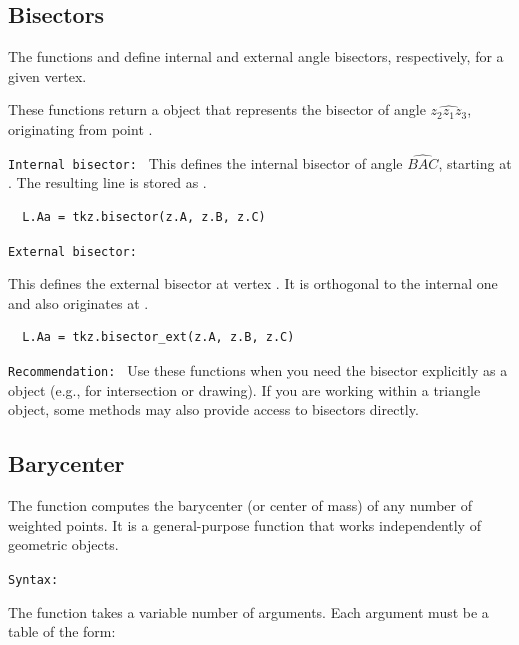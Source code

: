 \subsection{Bisectors}
\label{sub:bisector}

The functions  and  define internal and external angle bisectors, respectively, for a given vertex.

These functions return a  object that represents the bisector of angle $\widehat{z_2 z_1 z_3}$, originating from point .

\medskip
\texttt{Internal bisector: }
 This defines the internal bisector of angle $ \widehat{BAC}$, starting at . The resulting line is stored as .

\begin{mybox}
\begin{verbatim}
  L.Aa = tkz.bisector(z.A, z.B, z.C)
\end{verbatim}
\end{mybox}

\medskip
\texttt{External bisector: }

This defines the external bisector at vertex . It is orthogonal to the internal one and also originates at .

\begin{mybox}
\begin{verbatim}
  L.Aa = tkz.bisector_ext(z.A, z.B, z.C)
\end{verbatim}
\end{mybox}

\medskip
\texttt{Recommendation: }
Use these functions when you need the bisector explicitly as a  object (e.g., for intersection or drawing). If you are working within a triangle object, some methods may also provide access to bisectors directly.

\subsection{Barycenter}
\label{sub:misc_barycenter}

The function  computes the barycenter (or center of mass) of any number of weighted points. It is a general-purpose function that works independently of geometric objects.

\medskip
\texttt{Syntax: }

The function takes a variable number of arguments. Each argument must be a table of the form:

